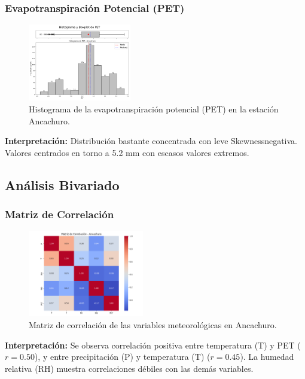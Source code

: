 \subsubsection*{Evapotranspiración Potencial (PET)}
\begin{figure}[H]
\centering
\includegraphics[width=0.4\textwidth]{resultados/por_estacion_meteorologica/Ancachuro/PET_histograma.png}
\caption{Histograma de la evapotranspiración potencial (PET) en la estación Ancachuro.}
\label{fig:ancachuro_PET}
\end{figure}
\textbf{Interpretación:} Distribución bastante concentrada con leve Skewnessnegativa. Valores centrados en torno a 5.2 mm con escasos valores extremos.

\subsection{Análisis Bivariado}

\subsubsection*{Matriz de Correlación}
\begin{figure}[H]
\centering
\includegraphics[width=0.45\textwidth]{resultados/por_estacion_meteorologica/Ancachuro/matriz_correlacion.png}
\caption{Matriz de correlación de las variables meteorológicas en Ancachuro.}
\label{fig:ancachuro_corr}
\end{figure}
\textbf{Interpretación:} Se observa correlación positiva entre temperatura (T) y PET (\(r = 0.50\)), y entre precipitación (P) y temperatura (T) (\(r = 0.45\)). La humedad relativa (RH) muestra correlaciones débiles con las demás variables.

